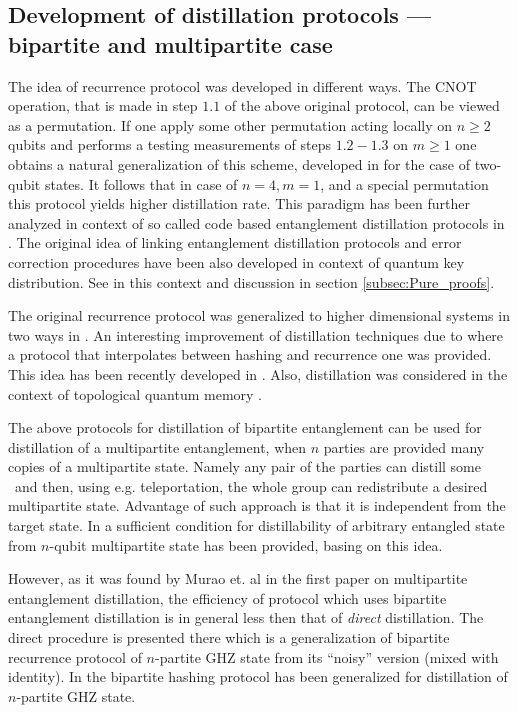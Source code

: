 \documentclass[twocolumn,aps,rmp]{revtex4}
\begin{document}
\subsection{Development of distillation protocols --- bipartite and multipartite case}

The idea of recurrence protocol was developed in different ways.  The
CNOT operation, that is made in step $1.1$ of the above original
protocol, can be viewed as a permutation. If one apply some other
permutation acting locally on $n \geq 2$ qubits and performs a testing
measurements of steps $1.2-1.3$ on $m\geq 1$ one obtains a natural
generalization of this scheme, developed in \cite{DhaeneRecur} for the
case of two-qubit states. It follows that in case of $n=4, m=1$, and a
special permutation this protocol yields higher distillation
rate. This paradigm has been further analyzed in context of so called
code based entanglement distillation protocols
\cite{Matsumoto,AmbGot2way} in \cite{DehaeneEquiv}. The original idea
of \cite{BBPSSW1996} linking entanglement distillation protocols and
error correction procedures \cite{GottesmanPhd} have been also
developed in context of quantum key distribution. See in this context
\cite{Gottesman-Lo,AbainisSY_GenEntPur} and discussion in section
\ref{subsec:Pure_proofs}.

The original recurrence protocol was generalized to higher dimensional systems
in two ways in \cite{reduction,AlberetalGXOR}.  An interesting improvement of
distillation techniques due to \cite{VollbrechtV2004-hash-rec} where a
protocol that interpolates between hashing and recurrence one was
provided. This idea has been recently developed in
\cite{DehaeneBestHashBread}. Also, distillation was considered
in the context of topological quantum memory \cite{Bombin-dist}.


The above protocols for distillation of bipartite entanglement can be
used for distillation of a multipartite entanglement, when $n$ parties
are provided many copies of a multipartite state. Namely any pair of
the parties can distill some \eprpairs\ and then, using
e.g. teleportation, the whole group can redistribute a desired
multipartite state.  Advantage of such approach is that it is
independent from the target state.  In
\cite{DCpur,DurC_multi_dist2000} a sufficient condition for
distillability of arbitrary entangled state from $n$-qubit
multipartite state has been provided, basing on this idea.

However, as it was found by Murao et. al in the first paper
\cite{MPPVKmultidist} on multipartite entanglement distillation, the
efficiency of protocol which uses bipartite entanglement distillation
is in general less then that of {\it direct} distillation. The direct
procedure is presented there which is a generalization of bipartite
recurrence protocol of $n$-partite GHZ state from its ``noisy''
version (mixed with identity). In \cite{ManevaS_multi_hash2002} the
bipartite hashing protocol has been generalized for distillation of
$n$-partite GHZ state.
\end{document}
